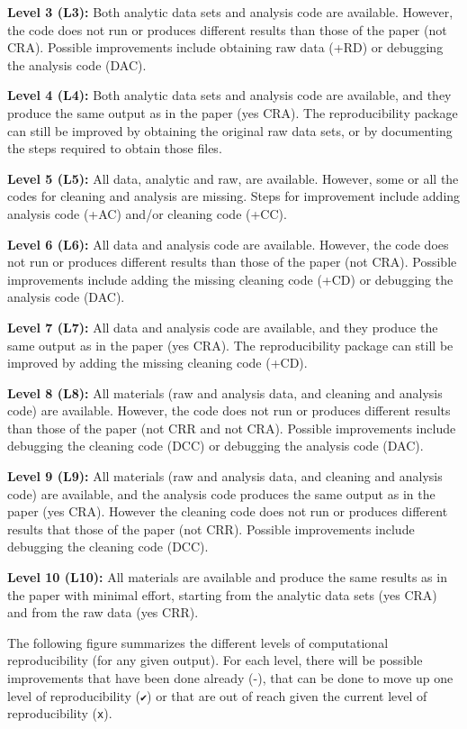\documentclass[]{book}
\begin{document}
\textbf{Level 3 (L3):} Both analytic data sets and analysis code are available. However, the code does not run or produces different results than those of the paper (not CRA). Possible improvements include obtaining raw data (+RD) or debugging the analysis code (DAC).

\textbf{Level 4 (L4):} Both analytic data sets and analysis code are available, and they produce the same output as in the paper (yes CRA). The reproducibility package can still be improved by obtaining the original raw data sets, or by documenting the steps required to obtain those files.

\textbf{Level 5 (L5):} All data, analytic and raw, are available. However, some or all the codes for cleaning and analysis are missing. Steps for improvement include adding analysis code (+AC) and/or cleaning code (+CC).

\textbf{Level 6 (L6):} All data and analysis code are available. However, the code does not run or produces different results than those of the paper (not CRA). Possible improvements include adding the missing cleaning code (+CD) or debugging the analysis code (DAC).

\textbf{Level 7 (L7):} All data and analysis code are available, and they produce the same output as in the paper (yes CRA). The reproducibility package can still be improved by adding the missing cleaning code (+CD).

\textbf{Level 8 (L8):} All materials (raw and analysis data, and cleaning and analysis code) are available. However, the code does not run or produces different results than those of the paper (not CRR and not CRA). Possible improvements include debugging the cleaning code (DCC) or debugging the analysis code (DAC).

\textbf{Level 9 (L9):} All materials (raw and analysis data, and cleaning and analysis code) are available, and the analysis code produces the same output as in the paper (yes CRA). However the cleaning code does not run or produces different results that those of the paper (not CRR). Possible improvements include debugging the cleaning code (DCC).

\textbf{Level 10 (L10):} All materials are available and produce the same results as in the paper with minimal effort, starting from the analytic data sets (yes CRA) and from the raw data (yes CRR).

The following figure summarizes the different levels of computational reproducibility (for any given output). For each level, there will be possible improvements that have been done already (-), that can be done to move up one level of reproducibility (\texttt{✔}) or that are out of reach given the current level of reproducibility (\texttt{x}).
\end{document}
